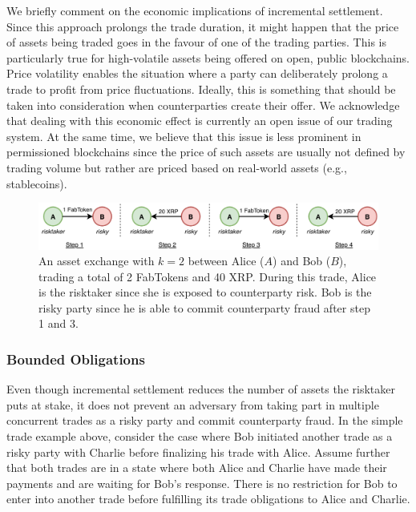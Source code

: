We briefly comment on the economic implications of incremental settlement.
Since this approach prolongs the trade duration, it might happen that the price of assets being traded goes in the favour of one of the trading parties.
This is particularly true for high-volatile assets being offered on open, public blockchains.
Price volatility enables the situation where a party can deliberately prolong a trade to profit from price fluctuations.
Ideally, this is something that should be taken into consideration when counterparties create their offer.
We acknowledge that dealing with this economic effect is currently an open issue of our trading system.
At the same time, we believe that this issue is less prominent in permissioned blockchains since the price of such assets are usually not defined by trading volume but rather are priced based on real-world assets (e.g., stablecoins).

\begin{figure}[t]
	\centering
	\includegraphics[width=\linewidth]{xchange/assets/trade}
	\caption{An asset exchange with $ k = 2 $ between Alice ($ A $) and Bob ($ B $), trading a total of 2 FabTokens and 40 XRP. During this trade, Alice is the risktaker since she is exposed to counterparty risk. Bob is the risky party since he is able to commit counterparty fraud after step 1 and 3.}
	\label{fig:incremental_trade}
\end{figure}

\subsubsection{Bounded Obligations}
\label{sec:bounded_obligations}
Even though incremental settlement reduces the number of assets the risktaker puts at stake, it does not prevent an adversary from taking part in multiple concurrent trades as a risky party and commit counterparty fraud. 
In the simple trade example above, consider the case where Bob initiated another trade as a risky party with Charlie before finalizing his trade with Alice.
Assume further that both trades are in a state where both Alice and Charlie have made their payments and are waiting for Bob's response. 
There is no restriction for Bob to enter into another trade before fulfilling its trade obligations to Alice and Charlie.

